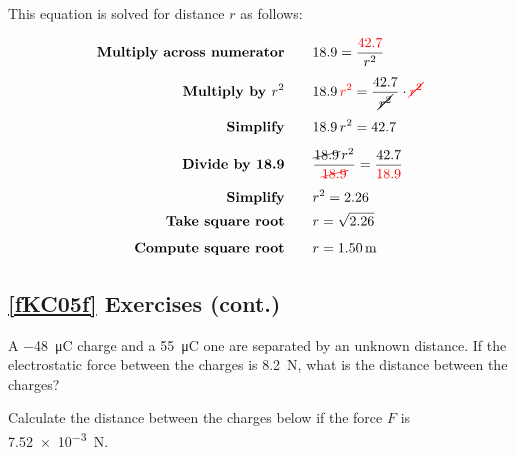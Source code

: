 \documentclass[main.tex]{subfiles}
\begin{document}
This equation is solved for distance $r$ as follows:

\begin{align*}
    \textbf{Multiply across numerator} \qquad & 18.9 = \frac{\textcolor{red}{42.7}}{r^2}\\[1ex]
    \textbf{Multiply by $r^2$} \qquad & 18.9\,\textcolor{red}{r^2} = \frac{42.7}{\cancel{r^2}} \cdot \textcolor{red}{\cancel{r^2}}\\[1ex]
    \textbf{Simplify} \qquad & 18.9\,r^2 = 42.7\\[1ex]
    \textbf{Divide by 18.9} \qquad & \frac{\cancel{18.9}\,r^2}{\textcolor{red}{\cancel{18.9}}} = \frac{42.7}{\textcolor{red}{18.9}}\\[1ex]
    \textbf{Simplify} \qquad & r^2 = 2.26\\
    \textbf{Take square root} \qquad & r = \sqrt{2.26}\\[1ex]
    \textbf{Compute square root} \qquad & r = \qty{1.50}{m}\\ 
\end{align*}

\cyanhrule

\subsection*{\ref{fKC05f} Exercises (cont.)}

\begin{exercise} \label{clmO0M}
    A \SI{-48}{\micro C} charge and a \SI{55}{\micro C} one are separated by an unknown distance. If the electrostatic force between the charges is \SI{8.2}{N}, what is the distance between the charges?
\end{exercise}

\begin{exercise} \label{TrRzFe}
Calculate the distance between the charges below if the force $F$ is \qty{7.52e-3}{N}.

\begin{center}
\end{center}
\end{exercise}
\end{document}
